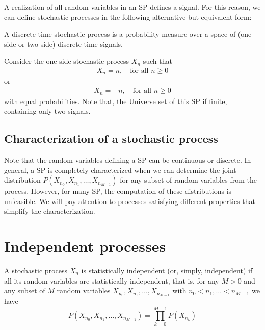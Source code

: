 A realization of all random variables in an SP defines a signal. For this reason, we can define stochastic processes in the following alternative but equivalent form:

\begin{definition}
A discrete-time stochastic process is a probability measure over a space of (one-side or two-side) discrete-time signals.
\end{definition}

\begin{example}
\label{ex:2signals}
Consider the one-side stochastic process $X_n$ such that
\begin{align}
X_n = n, 	\quad		\text{for all } n \ge 0
\end{align}
or 
\begin{align}
X_n = -n, 	\quad		\text{for all } n \ge 0
\end{align}
with equal probabilities. Note that, the Universe set of this SP if finite, containing only two signals.

\end{example}


\subsection{Characterization of a stochastic process}

Note that the random variables defining a SP can be continuous or discrete. In general, a SP is completely characterized when we can determine the joint distribution $P(X_{n_0},X_{n_1},\ldots, X_{n_{M-1}})$ for any subset of random variables from the process. However, for many SP, the computation of these distributions is unfeasible. We will pay attention to processes satisfying different properties that simplify the characterization.


\section{Independent processes}

\begin{definition}
A stochastic process $X_n$ is statistically independent (or, simply, independent) if all its random variables are statistically independent, that is, for any $M >0$ and any subset of $M$ random variables $X_{n_0}, X_{n_1}, \ldots, X_{n_{M-1}}$ with $n_0<n_1,\ldots < n_{M-1}$ we have
\begin{equation}
\label{def_indep}
P(X_{n_0}, X_{n_1}, \ldots, X_{n_{M-1}}) = \prod_{k=0}^{M-1} P(X_{n_k})
\end{equation}
\end{definition}

